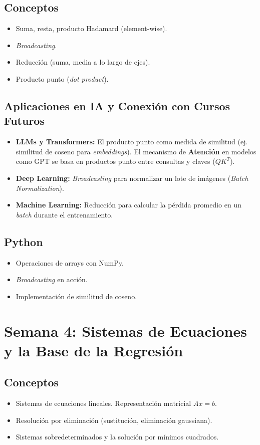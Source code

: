 \documentclass[12pt,a4paper,openany,oneside]{book}
\begin{document}
\subsection{Conceptos}
\begin{itemize}
    \item Suma, resta, producto Hadamard (element-wise).
    \item \textit{Broadcasting}.
    \item Reducción (suma, media a lo largo de ejes).
    \item Producto punto (\textit{dot product}).
\end{itemize}

\subsection{Aplicaciones en IA y Conexión con Cursos Futuros}
\begin{itemize}
    \item \textbf{LLMs y Transformers:} El producto punto como medida de similitud (ej. similitud de coseno para \textit{embeddings}). El mecanismo de \textbf{Atención} en modelos como GPT se basa en productos punto entre consultas y claves ($QK^T$).
    \item \textbf{Deep Learning:} \textit{Broadcasting} para normalizar un lote de imágenes (\textit{Batch Normalization}).
    \item \textbf{Machine Learning:} Reducción para calcular la pérdida promedio en un \textit{batch} durante el entrenamiento.
\end{itemize}

\subsection{Python}
\begin{itemize}
    \item Operaciones de arrays con NumPy.
    \item \textit{Broadcasting} en acción.
    \item Implementación de similitud de coseno.
\end{itemize}

\section{Semana 4: Sistemas de Ecuaciones y la Base de la Regresión}

\subsection{Conceptos}
\begin{itemize}
    \item Sistemas de ecuaciones lineales. Representación matricial \(Ax = b\).
    \item Resolución por eliminación (sustitución, eliminación gaussiana).
    \item Sistemas sobredeterminados y la solución por mínimos cuadrados.
\end{itemize}
\end{document}
